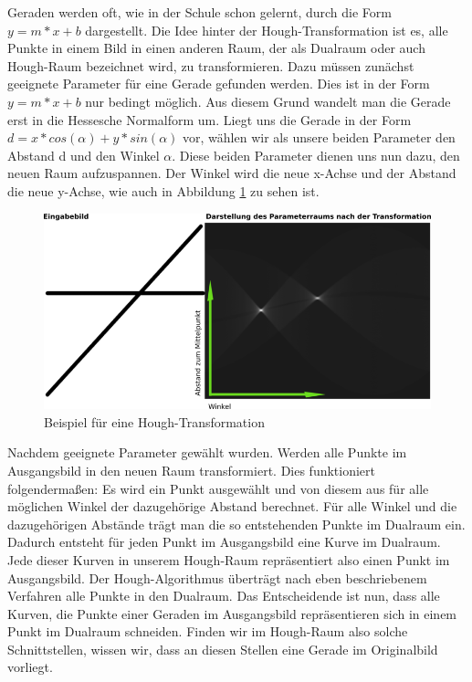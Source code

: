 \documentclass[a4paper,12pt]{article}
\begin{document}
Geraden werden oft, wie in der Schule schon gelernt, durch die Form 
\(y = m*x + b\) dargestellt. Die Idee hinter der Hough-Transformation ist es,
alle Punkte in einem Bild in einen anderen Raum, der als Dualraum oder auch
Hough-Raum bezeichnet wird, zu transformieren. Dazu müssen zunächst
geeignete Parameter für eine Gerade gefunden werden. Dies ist in der Form
\(y = m*x + b\) nur bedingt möglich. Aus diesem Grund wandelt
man die Gerade erst in die Hessesche Normalform um. Liegt uns die Gerade in der Form 
\(d = x*cos(\alpha) + y*sin(\alpha)\) vor, wählen wir als unsere
beiden Parameter den Abstand d und den Winkel \(\alpha\). Diese
beiden Parameter dienen uns nun dazu, den neuen Raum aufzuspannen.
Der Winkel wird die neue x-Achse und der Abstand die neue y-Achse,
wie auch in Abbildung \ref{fig:hough1} zu sehen ist.
\begin{figure}[H]
    \includegraphics[scale=0.45]{hough1.png}
    \caption{Beispiel für eine Hough-Transformation}
    \label{fig:hough1}
\end{figure}
Nachdem geeignete Parameter gewählt wurden. Werden alle Punkte im Ausgangsbild
in den neuen Raum transformiert. Dies funktioniert folgendermaßen:
Es wird ein Punkt ausgewählt und von diesem aus für alle möglichen Winkel
der dazugehörige Abstand berechnet. Für alle Winkel und die dazugehörigen
Abstände trägt man die so entstehenden Punkte im Dualraum ein.
Dadurch entsteht für jeden Punkt im Ausgangsbild eine Kurve im Dualraum.
Jede dieser Kurven in unserem Hough-Raum repräsentiert also einen Punkt
im Ausgangsbild. Der Hough-Algorithmus überträgt nach eben beschriebenem
Verfahren alle Punkte in den Dualraum. Das Entscheidende ist nun, dass 
alle Kurven, die Punkte einer Geraden im Ausgangsbild repräsentieren sich
in einem Punkt im Dualraum schneiden. Finden wir im Hough-Raum also solche Schnittstellen,
wissen wir, dass an diesen Stellen eine Gerade im Originalbild vorliegt.
\end{document}
